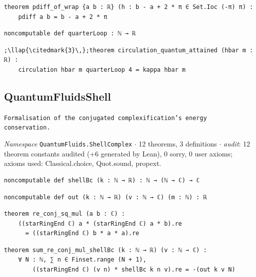 \begin{lstlisting}[style=leancat]
theorem pdiff_of_wrap {a b : ℝ} (h : b - a + 2 * π ∈ Set.Ioc (-π) π) :
    pdiff a b = b - a + 2 * π
\end{lstlisting}

\begin{lstlisting}[style=leancat]
noncomputable def quarterLoop : ℕ → ℝ
\end{lstlisting}

\begin{lstlisting}[style=leancat]
;\llap{\citedmark{3}\,};theorem circulation_quantum_attained (hbar m : ℝ) :
    circulation hbar m quarterLoop 4 = kappa hbar m
\end{lstlisting}

\subsection{QuantumFluidsShell}\label{appA:QuantumFluidsShell}
{\footnotesize\raggedright\texttt{Formalisation of the conjugated complexification's energy conservation.\allowbreak{}}\par}
{\footnotesize\raggedright\emph{Namespace} \texttt{QuantumFluids.\allowbreak{}ShellComplex} $\cdot$ 12 theorems, 3 definitions $\cdot$ \emph{audit}: 12 theorem constants audited (+6 generated by Lean), 0 sorry, 0 user axioms; axioms used: Classical.choice, Quot.sound, propext.\par}
\vspace{1pt}
\begin{lstlisting}[style=leancat]
noncomputable def shellBc (k : ℕ → ℝ) : ℕ → (ℕ → ℂ) → ℂ
\end{lstlisting}

\begin{lstlisting}[style=leancat]
noncomputable def out (k : ℕ → ℝ) (v : ℕ → ℂ) (m : ℕ) : ℝ
\end{lstlisting}

\begin{lstlisting}[style=leancat]
theorem re_conj_sq_mul (a b : ℂ) :
    ((starRingEnd ℂ) a * (starRingEnd ℂ) a * b).re
      = ((starRingEnd ℂ) b * a * a).re
\end{lstlisting}

\begin{lstlisting}[style=leancat]
theorem sum_re_conj_mul_shellBc (k : ℕ → ℝ) (v : ℕ → ℂ) :
    ∀ N : ℕ, ∑ n ∈ Finset.range (N + 1),
        ((starRingEnd ℂ) (v n) * shellBc k n v).re = -(out k v N)
\end{lstlisting}

